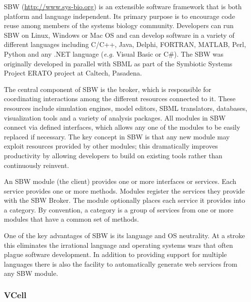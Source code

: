 SBW (\url{http://www.sys-bio.org}) \autocite{bergmann2006sbw} is an
extensible software framework that is both platform and language
independent. Its primary purpose is to encourage code reuse among
members of the systems biology community. Developers can run SBW on
Linux, Windows or Mac OS and can develop software in a variety of
different languages including C/C++, Java, Delphi, FORTRAN, MATLAB,
Perl, Python and any .NET language (\emph{e.g.} Visual Basic or C\#).
The SBW was originally developed in parallel with SBML as part of the
Symbiotic Systems Project ERATO project at Caltech, Pasadena.

The central component of SBW is the broker, which is responsible for
coordinating interactions among the different resources connected to it.
These resources include simulation engines, model editors, SBML
translators, databases, visualization tools and a variety of analysis
packages. All modules in SBW connect via defined interfaces, which
allows any one of the modules to be easily replaced if necessary. The
key concept in SBW is that any new module may exploit resources provided
by other modules; this dramatically improves productivity by allowing
developers to build on existing tools rather than continuously reinvent.

An SBW module (the client) provides one or more interfaces or services.
Each service provides one or more methods. Modules register the services
they provide with the SBW Broker. The module optionally places each
service it provides into a category. By convention, a category is a
group of services from one or more modules that have a common set of
methods.

One of the key advantages of SBW is its language and OS neutrality. At a
stroke this eliminates the irrational language and operating systems
wars that often plague software development. In addition to providing
support for multiple languages there is also the facility to
automatically generate web services from any SBW module.

\subsubsection{VCell}


